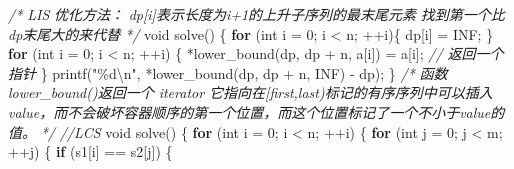 \documentclass[
]{article}
\newenvironment{Shaded}{}{}
\newcommand{\CommentTok}[1]{\textcolor[rgb]{0.38,0.63,0.69}{\textit{#1}}}
\newcommand{\ControlFlowTok}[1]{\textcolor[rgb]{0.00,0.44,0.13}{\textbf{#1}}}
\newcommand{\DataTypeTok}[1]{\textcolor[rgb]{0.56,0.13,0.00}{#1}}
\newcommand{\DecValTok}[1]{\textcolor[rgb]{0.25,0.63,0.44}{#1}}
\newcommand{\NormalTok}[1]{#1}
\newcommand{\OperatorTok}[1]{\textcolor[rgb]{0.40,0.40,0.40}{#1}}
\newcommand{\SpecialCharTok}[1]{\textcolor[rgb]{0.25,0.44,0.63}{#1}}
\newcommand{\StringTok}[1]{\textcolor[rgb]{0.25,0.44,0.63}{#1}}
\begin{document}
\begin{Shaded}
\begin{Highlighting}[]
\CommentTok{/* LIS }
\CommentTok{    优化方法：}
\CommentTok{    dp[i]表示长度为i+1的上升子序列的最末尾元素  }
\CommentTok{    找到第一个比dp末尾大的来代替 }
\CommentTok{*/}
    \DataTypeTok{void}\NormalTok{ solve}\OperatorTok{()} \OperatorTok{\{}  
        \ControlFlowTok{for} \OperatorTok{(}\DataTypeTok{int}\NormalTok{ i }\OperatorTok{=} \DecValTok{0}\OperatorTok{;}\NormalTok{ i }\OperatorTok{\textless{}}\NormalTok{ n}\OperatorTok{;} \OperatorTok{++}\NormalTok{i}\OperatorTok{)\{}
\NormalTok{            dp}\OperatorTok{[}\NormalTok{i}\OperatorTok{]} \OperatorTok{=}\NormalTok{ INF}\OperatorTok{;}
        \OperatorTok{\}}
        \ControlFlowTok{for} \OperatorTok{(}\DataTypeTok{int}\NormalTok{ i }\OperatorTok{=} \DecValTok{0}\OperatorTok{;}\NormalTok{ i }\OperatorTok{\textless{}}\NormalTok{ n}\OperatorTok{;} \OperatorTok{++}\NormalTok{i}\OperatorTok{)} \OperatorTok{\{}  
            \OperatorTok{*}\NormalTok{lower\_bound}\OperatorTok{(}\NormalTok{dp}\OperatorTok{,}\NormalTok{ dp }\OperatorTok{+}\NormalTok{ n}\OperatorTok{,}\NormalTok{ a}\OperatorTok{[}\NormalTok{i}\OperatorTok{])} \OperatorTok{=}\NormalTok{ a}\OperatorTok{[}\NormalTok{i}\OperatorTok{];}  \CommentTok{//  返回一个指针  }
        \OperatorTok{\}}  
\NormalTok{        printf}\OperatorTok{(}\StringTok{"}\SpecialCharTok{\%d\textbackslash{}n}\StringTok{"}\OperatorTok{,} \OperatorTok{*}\NormalTok{lower\_bound}\OperatorTok{(}\NormalTok{dp}\OperatorTok{,}\NormalTok{ dp }\OperatorTok{+}\NormalTok{ n}\OperatorTok{,}\NormalTok{ INF}\OperatorTok{)} \OperatorTok{{-}}\NormalTok{ dp}\OperatorTok{);}  
    \OperatorTok{\}}
\CommentTok{/*  }
\CommentTok{    函数lower\_bound()返回一个 iterator 它指向在[first,last)标记的有序序列中可以插入value，而不会破坏容器顺序的第一个位置，而这个位置标记了一个不小于value的值。}
\CommentTok{*/}
\CommentTok{//LCS }
\DataTypeTok{void}\NormalTok{ solve}\OperatorTok{()} \OperatorTok{\{}  
    \ControlFlowTok{for} \OperatorTok{(}\DataTypeTok{int}\NormalTok{ i }\OperatorTok{=} \DecValTok{0}\OperatorTok{;}\NormalTok{ i }\OperatorTok{\textless{}}\NormalTok{ n}\OperatorTok{;} \OperatorTok{++}\NormalTok{i}\OperatorTok{)} \OperatorTok{\{}  
        \ControlFlowTok{for} \OperatorTok{(}\DataTypeTok{int}\NormalTok{ j }\OperatorTok{=} \DecValTok{0}\OperatorTok{;}\NormalTok{ j }\OperatorTok{\textless{}}\NormalTok{ m}\OperatorTok{;} \OperatorTok{++}\NormalTok{j}\OperatorTok{)} \OperatorTok{\{}  
            \ControlFlowTok{if} \OperatorTok{(}\NormalTok{s1}\OperatorTok{[}\NormalTok{i}\OperatorTok{]} \OperatorTok{==}\NormalTok{ s2}\OperatorTok{[}\NormalTok{j}\OperatorTok{])} \OperatorTok{\{}  

\end{Highlighting}
\end{Shaded}
\end{document}

